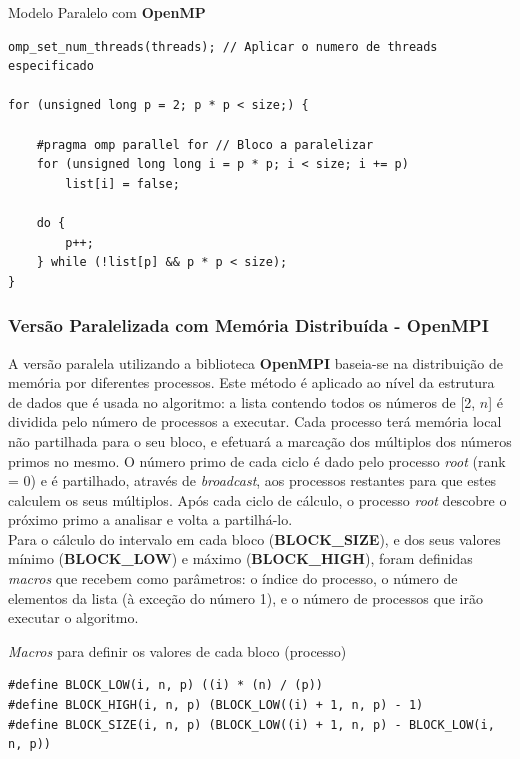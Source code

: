 \documentclass[a4paper]{article}
\begin{document}
\begin{algorithm}
\caption{Modelo Paralelo com \textbf{OpenMP}}
\label{alg:OpenMPSieve}
\begin{lstlisting}
omp_set_num_threads(threads); // Aplicar o numero de threads especificado

for (unsigned long p = 2; p * p < size;) {

	#pragma omp parallel for // Bloco a paralelizar
	for (unsigned long long i = p * p; i < size; i += p)
		list[i] = false;
	
	do {
		p++;
	} while (!list[p] && p * p < size);
}
\end{lstlisting}
\end{algorithm}

\subsubsection{Versão Paralelizada com Memória Distribuída - OpenMPI}

A versão paralela utilizando a biblioteca \textbf{OpenMPI} baseia-se na distribuição de memória por diferentes processos. Este método é aplicado ao nível da estrutura de dados que é usada no algoritmo: a lista contendo todos os números de [2, $n$] é dividida pelo número de processos a executar. Cada processo terá memória local não partilhada para o seu bloco, e efetuará a marcação dos múltiplos dos números primos no mesmo. O número primo de cada ciclo é dado pelo processo \textit{root} (rank = 0) e é partilhado, através de \textit{broadcast}, aos processos restantes para que estes calculem os seus múltiplos. Após cada ciclo de cálculo, o processo \textit{root} descobre o próximo primo a analisar e volta a partilhá-lo.\\

Para o cálculo do intervalo em cada bloco (\textbf{BLOCK\_SIZE}), e dos seus valores mínimo (\textbf{BLOCK\_LOW}) e máximo (\textbf{BLOCK\_HIGH}), foram definidas \textit{macros} que recebem como parâmetros: o índice do processo, o número de elementos da lista (à exceção do número 1), e o número de processos que irão executar o algoritmo.

\begin{algorithm}
\caption{\textit{Macros} para definir os valores de cada bloco (processo)}
\label{alg:Macros}
\begin{lstlisting}
#define BLOCK_LOW(i, n, p) ((i) * (n) / (p))
#define BLOCK_HIGH(i, n, p) (BLOCK_LOW((i) + 1, n, p) - 1)
#define BLOCK_SIZE(i, n, p) (BLOCK_LOW((i) + 1, n, p) - BLOCK_LOW(i, n, p))
\end{lstlisting}
\end{algorithm}
\end{document}
